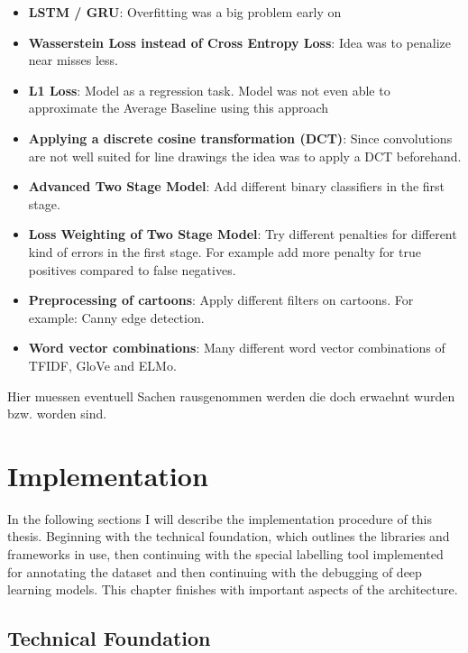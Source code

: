 \documentclass[draft,final,oneside]{vutinfth} %
\begin{document}
\begin{itemize}
\item \textbf{LSTM / GRU}: Overfitting was a big problem early on
\item \textbf{Wasserstein Loss instead of Cross Entropy Loss}: Idea was to penalize near misses less.
\item \textbf{L1 Loss}: Model as a regression task. Model was not even able to approximate the Average Baseline using this approach
\item \textbf{Applying a discrete cosine transformation (DCT)}: Since convolutions are not well suited for line drawings the idea was to apply a DCT beforehand. 
\item \textbf{Advanced Two Stage Model}: Add different binary classifiers in the first stage.
\item \textbf{Loss Weighting of Two Stage Model}: Try different penalties for different kind of errors in the first stage. For example add more penalty for true positives compared to false negatives.
\item \textbf{Preprocessing of cartoons}: Apply different filters on cartoons. For example: Canny edge detection.
\item \textbf{Word vector combinations}: Many different word vector combinations of TFIDF, GloVe and ELMo. 
\end{itemize}

Hier muessen eventuell Sachen rausgenommen werden die doch erwaehnt wurden bzw. worden sind.
\fi

\chapter{Implementation} \label{implementationchapter}

In the following sections I will describe the implementation procedure of this thesis. Beginning with the technical foundation, which outlines the libraries and frameworks in use, then continuing with the special labelling tool implemented for annotating the dataset and then continuing with the debugging of deep learning models. This chapter finishes with important aspects of the architecture.

\section{Technical Foundation}
\end{document}
